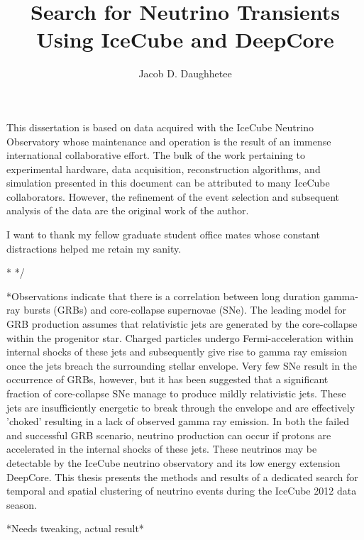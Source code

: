 \documentclass{gatech-thesis}
\title{Search for Neutrino Transients Using IceCube and DeepCore}
\author{Jacob D. Daughhetee}
\begin{document}

\begin{preliminary}
\begin{dedication}
\null\vfil
{\large
\begin{center}

\end{center}}
\vfil\null
\end{dedication}
\begin{preface}
This dissertation is based on data acquired with the IceCube Neutrino Observatory whose maintenance and operation is the result of an immense international collaborative effort. The bulk of the work pertaining to experimental hardware, data acquisition, reconstruction algorithms, and simulation presented in this document can be attributed to many IceCube collaborators. However, the refinement of the event selection and subsequent analysis of the data are the original work of the author.
\end{preface}
\begin{acknowledgements}
I want to thank my fellow graduate student office mates whose constant distractions helped me retain my sanity.
\end{acknowledgements}
\contents

\begin{summary}

\long{}
\/*
*/

*Observations indicate that there is a correlation between long duration gamma-ray bursts (GRBs) and core-collapse supernovae (SNe).  The leading model for GRB production assumes that relativistic jets are generated by the core-collapse within the progenitor star.  Charged particles undergo Fermi-acceleration within internal shocks of these jets and subsequently give rise to gamma ray emission once the jets breach the surrounding stellar envelope.  Very few SNe result in the occurrence of GRBs, however,  but it has been suggested that a significant fraction of core-collapse SNe manage to produce mildly relativistic jets.  These jets are insufficiently energetic to break through the envelope and are effectively 'choked' resulting in a lack of observed gamma ray emission.  In both the failed and successful GRB scenario, neutrino production can occur if protons are accelerated in the internal shocks of these jets.  These neutrinos may be detectable by the IceCube neutrino observatory and its low energy extension DeepCore. This thesis presents the methods and results of a dedicated search for temporal and spatial clustering of neutrino events during the IceCube 2012 data season.

*Needs tweaking, actual result*


\end{summary}

\end{preliminary}
\end{document}
